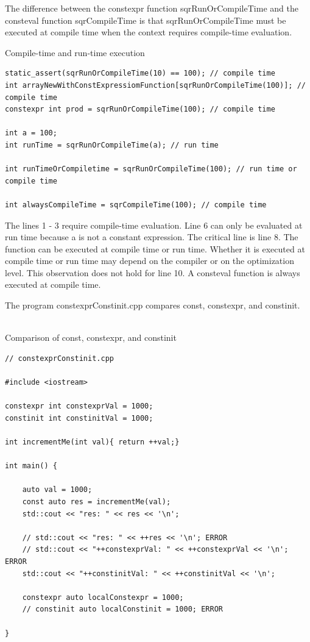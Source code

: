 The difference between the constexpr function sqrRunOrCompileTime and the consteval function sqrCompileTime is that sqrRunOrCompileTime must be executed at compile time when the context requires compile-time evaluation.

\noindent
Compile-time and run-time execution
\begin{lstlisting}[style=styleCXX]
static_assert(sqrRunOrCompileTime(10) == 100); // compile time
int arrayNewWithConstExpressiomFunction[sqrRunOrCompileTime(100)]; // compile time
constexpr int prod = sqrRunOrCompileTime(100); // compile time

int a = 100;
int runTime = sqrRunOrCompileTime(a); // run time

int runTimeOrCompiletime = sqrRunOrCompileTime(100); // run time or compile time

int alwaysCompileTime = sqrCompileTime(100); // compile time
\end{lstlisting}

The lines 1 - 3 require compile-time evaluation. Line 6 can only be evaluated at run time because a is not a constant expression. The critical line is line 8. The function can be executed at compile time or run time. Whether it is executed at compile time or run time may depend on the compiler or on the optimization level. This observation does not hold for line 10. A consteval function is always executed at compile time.


The program constexprConstinit.cpp compares const, constexpr, and constinit.

\hspace*{\fill} \\ %
\noindent
Comparison of const, constexpr, and constinit
\begin{lstlisting}[style=styleCXX]
// constexprConstinit.cpp

#include <iostream>

constexpr int constexprVal = 1000;
constinit int constinitVal = 1000;

int incrementMe(int val){ return ++val;}

int main() {
	
	auto val = 1000;
	const auto res = incrementMe(val);
	std::cout << "res: " << res << '\n';
	
	// std::cout << "res: " << ++res << '\n'; ERROR
	// std::cout << "++constexprVal: " << ++constexprVal << '\n'; ERROR
	std::cout << "++constinitVal: " << ++constinitVal << '\n';
	
	constexpr auto localConstexpr = 1000;
	// constinit auto localConstinit = 1000; ERROR

}
\end{lstlisting}


